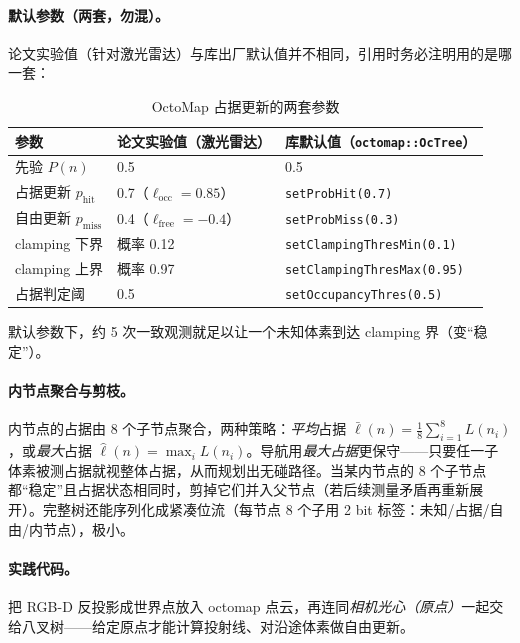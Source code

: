 \paragraph{默认参数（两套，勿混）。}
论文实验值（针对激光雷达）与库出厂默认值并不相同，引用时务必注明用的是哪一套\cite{hornung2013octomap}：

\begin{table}[H]\centering\small
\caption{OctoMap 占据更新的两套参数}
\label{tab:dense-octo-params}
\begin{tabular}{lll}
\toprule
参数 & 论文实验值（激光雷达） & 库默认值（\texttt{octomap::OcTree}） \\
\midrule
先验 $P(n)$ & 0.5 & 0.5 \\
占据更新 $p_{\mathrm{hit}}$ & 0.7（$\ell_{\mathrm{occ}}=0.85$） & \texttt{setProbHit(0.7)} \\
自由更新 $p_{\mathrm{miss}}$ & 0.4（$\ell_{\mathrm{free}}=-0.4$） & \texttt{setProbMiss(0.3)} \\
clamping 下界 & 概率 0.12 & \texttt{setClampingThresMin(0.1)} \\
clamping 上界 & 概率 0.97 & \texttt{setClampingThresMax(0.95)} \\
占据判定阈 & 0.5 & \texttt{setOccupancyThres(0.5)} \\
\bottomrule
\end{tabular}
\end{table}

\noindent{}默认参数下，约 5 次一致观测就足以让一个未知体素到达 clamping 界（变“稳定”）。

\paragraph{内节点聚合与剪枝。}
内节点的占据由 8 个子节点聚合，两种策略：\emph{平均}占据 $\bar\ell(n)=\frac18\sum_{i=1}^{8}L(n_i)$，或\emph{最大}占据 $\hat\ell(n)=\max_i L(n_i)$。导航用\emph{最大占据}更保守——只要任一子体素被测占据就视整体占据，从而规划出无碰路径。当某内节点的 8 个子节点都“稳定”且占据状态相同时，剪掉它们并入父节点（若后续测量矛盾再重新展开）。完整树还能序列化成紧凑位流（每节点 8 个子用 2 bit 标签：未知/占据/自由/内节点），极小。

\paragraph{实践代码。}
把 RGB-D 反投影成世界点放入 octomap 点云，再连同\emph{相机光心（原点）}一起交给八叉树——给定原点才能计算投射线、对沿途体素做自由更新。

